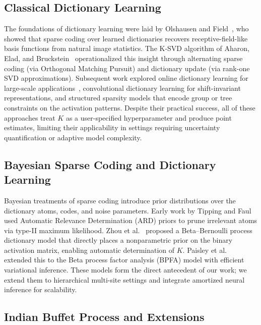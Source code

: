 \documentclass[11pt,a4paper]{article}
\theoremstyle{definition}
\begin{document}
\subsection{Classical Dictionary Learning}

The foundations of dictionary learning were laid by Olshausen and Field~\citep{olshausen1996}, who showed that sparse coding over learned dictionaries recovers receptive-field-like basis functions from natural image statistics. The K-SVD algorithm of Aharon, Elad, and Bruckstein~\citep{aharon2006} operationalized this insight through alternating sparse coding (via Orthogonal Matching Pursuit) and dictionary update (via rank-one SVD approximations). Subsequent work explored online dictionary learning for large-scale applications~\citep{mairal2009}, convolutional dictionary learning for shift-invariant representations, and structured sparsity models that encode group or tree constraints on the activation patterns. Despite their practical success, all of these approaches treat $K$ as a user-specified hyperparameter and produce point estimates, limiting their applicability in settings requiring uncertainty quantification or adaptive model complexity.

\subsection{Bayesian Sparse Coding and Dictionary Learning}

Bayesian treatments of sparse coding introduce prior distributions over the dictionary atoms, codes, and noise parameters. Early work by Tipping and Faul~\citep{tipping2003} used Automatic Relevance Determination (ARD) priors to prune irrelevant atoms via type-II maximum likelihood. Zhou et al.~\citep{zhou2012} proposed a Beta--Bernoulli process dictionary model that directly places a nonparametric prior on the binary activation matrix, enabling automatic determination of $K$. Paisley et al.~\citep{paisley2015} extended this to the Beta process factor analysis (BPFA) model with efficient variational inference. These models form the direct antecedent of our work; we extend them to hierarchical multi-site settings and integrate amortized neural inference for scalability.

\subsection{Indian Buffet Process and Extensions}
\end{document}
